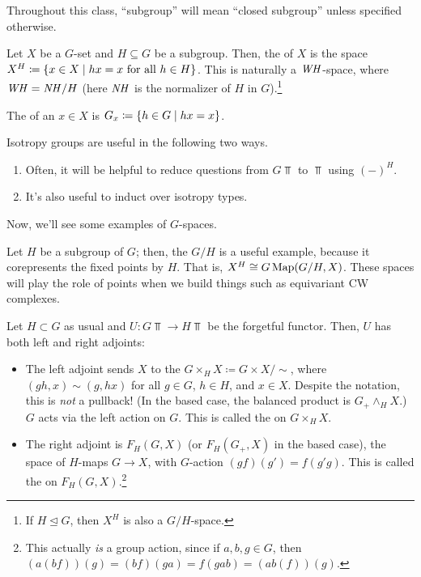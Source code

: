 Throughout this class, ``subgroup'' will mean ``closed subgroup'' unless specified otherwise.
\begin{defn}
Let $X$ be a $G$-set and $H\subseteq G$ be a subgroup. Then, the  of $X$ is the space
$X^H\coloneqq \{x\in X\mid hx = x\text{ for all } h\in H\}$. This is naturally a $\mathit{WH}$-space, where $\mathit{WH} = \mathit{NH}/H$
(here $\mathit{NH}$ is the normalizer of $H$ in $G$).\footnote{If $H\trianglelefteq G$, then $X^H$ is also a $G/H$-space.}
\end{defn}
\begin{defn}
The  of an $x\in X$ is $G_x\coloneqq \{h\in G\mid hx = x\}$.
\end{defn}
Isotropy groups are useful in the following two ways.
\begin{enumerate}
	\item Often, it will be helpful to reduce questions from $G\Top$ to $\Top$ using $(-)^H$.
	\item It's also useful to induct over isotropy types.
\end{enumerate}
Now, we'll see some examples of $G$-spaces.
\begin{exm}
Let $H$ be a subgroup of $G$; then, the  $G/H$ is a useful example, because it corepresents the
fixed points by $H$. That is, $X^H \cong G\operatorname{Map}(G/H, X)$. These spaces will play the role of points when we build
things such as equivariant CW complexes.
\end{exm}
\begin{exm}
Let $H\subset G$ as usual and $U\colon G\Top\to H\Top$ be the forgetful functor. Then, $U$ has both left and right
adjoints:
\begin{itemize}
	\item The left adjoint sends $X$ to the  $G\times_H X\coloneqq G\times X/\sim$, where
	$(gh, x)\sim (g, hx)$ for all $g\in G$, $h\in H$, and $x\in X$. Despite the notation, this is \emph{not} a
	pullback! (In the based case, the balanced product is $G_+\wedge_H X$.) $G$ acts via the left action on $G$.
	This is called the  on $G\times_H X$.
	\item The right adjoint is $F_H(G,X)$ (or $F_H(G_+, X)$ in the based case), the space of $H$-maps $G\to X$,
	with $G$-action $(gf)(g') = f(g'g)$. This is called the  on
	$F_H(G,X)$.\footnote{This actually \emph{is} a group action, since if $a,b,g\in G$, then $(a(b f))(g) =
	(bf)(ga) = f(gab) = (ab(f))(g)$.} \qedhere
\end{itemize}
\end{exm}

